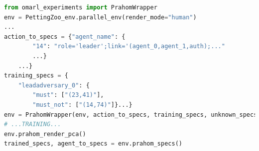 \documentclass[contribution]{jfsma}
\begin{document}
\begin{lstlisting}[language=Python, caption={Utilisation basique de \emph{PRAHOM PettingZoo Wrapper}}, label={lst:wrapper_basic_use}]
from omarl_experiments import PrahomWrapper
env = PettingZoo_env.parallel_env(render_mode="human")
...
action_to_specs = {"agent_name": {
        "14": "role='leader';link='(agent_0,agent_1,auth);..."
        ...}    
    ...}
training_specs = {
    "leadadversary_0": {
        "must": ["(23,41)"],
        "must_not": ["(14,74)"]}...}
env = PrahomWrapper(env, action_to_specs, training_specs, unknown_specs_inference=True, pca_output=True)
# ...TRAINING...
env.prahom_render_pca()
trained_specs, agent_to_specs = env.prahom_specs()
\end{lstlisting}



\end{document}

